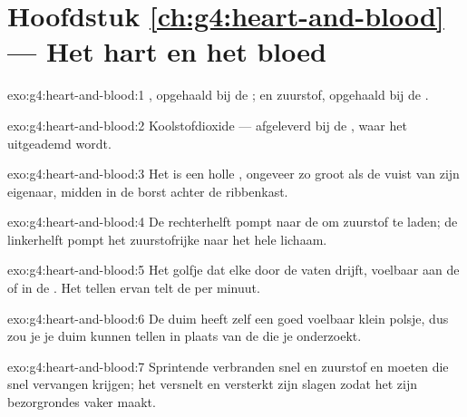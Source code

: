 \section*{Hoofdstuk \ref{ch:g4:heart-and-blood} --- Het hart en het bloed}

\begin{solution}{exo:g4:heart-and-blood:1}
, opgehaald bij de ; en zuurstof, opgehaald bij
de .
\end{solution}

\begin{solution}{exo:g4:heart-and-blood:2}
Koolstofdioxide --- afgeleverd bij de , waar het uitgeademd wordt.
\end{solution}

\begin{solution}{exo:g4:heart-and-blood:3}
Het is een holle , ongeveer zo groot als de vuist van zijn
eigenaar, midden in de borst achter de ribbenkast.
\end{solution}

\begin{solution}{exo:g4:heart-and-blood:4}
De rechterhelft pompt  naar de  om zuurstof te laden; de
linkerhelft pompt het zuurstofrijke  naar het hele lichaam.
\end{solution}

\begin{solution}{exo:g4:heart-and-blood:5}
Het golfje dat elke  door de vaten drijft, voelbaar aan de 
of in de . Het tellen ervan telt de  per minuut.
\end{solution}

\begin{solution}{exo:g4:heart-and-blood:6}
De duim heeft zelf een goed voelbaar klein polsje, dus zou je je duim
kunnen tellen in plaats van de  die je onderzoekt.
\end{solution}

\begin{solution}{exo:g4:heart-and-blood:7}
Sprintende  verbranden snel  en zuurstof en moeten
die snel vervangen krijgen; het  versnelt en versterkt zijn slagen
zodat het  zijn bezorgrondes vaker maakt.
\end{solution}

